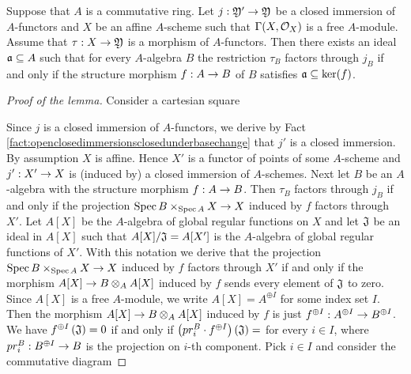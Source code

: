\begin{lemma}\label{lemma:foraffinelocalfactorization}
Suppose that $A$ is a commutative ring. Let $j:{\mathfrak Y}'\rightarrow {\mathfrak Y}$ be a closed immersion of $A$-functors and $X$ be an affine $A$-scheme such that $\Gamma(X,{\mathcal O}_X)$ is a free $A$-module. Assume that $\tau:X\rightarrow {\mathfrak Y}$ is a morphism of $A$-functors. Then there exists an ideal $\mathfrak{a}\subseteq A$ such that for every $A$-algebra $B$ the restriction $\tau_B$ factors through $j_B$ if and only if the structure morphism $f:A\rightarrow B$ of $B$ satisfies $\mathfrak{a}\subseteq \ker(f)$.
\end{lemma}
\begin{proof}[Proof of the lemma]
Consider a cartesian square
\begin{center}
\end{center}
Since $j$ is a closed immersion of $A$-functors, we derive by Fact \ref{fact:openclosedimmersionsclosedunderbasechange} that $j'$ is a closed immersion. By assumption $X$ is affine. Hence $X'$ is a functor of points of some $A$-scheme and $j':X'\rightarrow X$ is (induced by) a closed immersion of $A$-schemes. Next let $B$ be an $A$-algebra with the structure morphism $f:A\rightarrow B$. Then $\tau_B$ factors through $j_B$ if and only if the projection $\mathrm{Spec}\, B\times_{\mathrm{Spec}\, A}X\rightarrow X$ induced by $f$ factors through $X'$. Let $A[X]$ be the $A$-algebra of global regular functions on $X$ and let $\mathfrak{J}$ be an ideal in $A[X]$ such that $A[X]/\mathfrak{J} = A[X']$ is the $A$-algebra of global regular functions of $X'$. With this notation we derive that the projection $\mathrm{Spec}\, B\times_{\mathrm{Spec}\, A}X\rightarrow X$ induced by $f$ factors through $X'$ if and only if the morphism $A[X]\rightarrow B\otimes_AA[X]$ induced by $f$ sends every element of $\mathfrak{J}$ to zero. Since $A[X]$ is a free $A$-module, we write $A[X] = A^{\oplus I}$ for some index set $I$. Then the morphism $A[X]\rightarrow B\otimes_AA[X]$ induced by $f$ is just $f^{\oplus I}:A^{\oplus I}\rightarrow B^{\oplus I}$. We have $f^{\oplus I}\left(\mathfrak{J}\right)=0$ if and only if $\left(pr^B_i\cdot f^{\oplus I}\right)\left(\mathfrak{J}\right)=$ for every $i\in I$, where $pr^B_i:B^{\oplus I}\rightarrow B$ is the projection on $i$-th component. Pick $i\in I$ and consider the commutative diagram

\end{proof}
